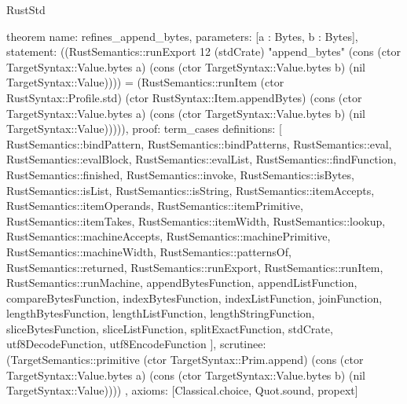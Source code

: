 \begin{lexlean}{RustStd}
\begin{semanticmodule}
theorem{
  name: refines_append_bytes,
  parameters: [a : Bytes, b : Bytes],
  statement: ((RustSemantics::runExport 12 (stdCrate) "append_bytes" (cons (ctor TargetSyntax::Value.bytes a) (cons (ctor TargetSyntax::Value.bytes b) (nil TargetSyntax::Value)))) = (RustSemantics::runItem (ctor RustSyntax::Profile.std) (ctor RustSyntax::Item.appendBytes) (cons (ctor TargetSyntax::Value.bytes a) (cons (ctor TargetSyntax::Value.bytes b) (nil TargetSyntax::Value))))),
  proof: term_cases{
    definitions: [
      RustSemantics::bindPattern,
      RustSemantics::bindPatterns,
      RustSemantics::eval,
      RustSemantics::evalBlock,
      RustSemantics::evalList,
      RustSemantics::findFunction,
      RustSemantics::finished,
      RustSemantics::invoke,
      RustSemantics::isBytes,
      RustSemantics::isList,
      RustSemantics::isString,
      RustSemantics::itemAccepts,
      RustSemantics::itemOperands,
      RustSemantics::itemPrimitive,
      RustSemantics::itemTakes,
      RustSemantics::itemWidth,
      RustSemantics::lookup,
      RustSemantics::machineAccepts,
      RustSemantics::machinePrimitive,
      RustSemantics::machineWidth,
      RustSemantics::patternsOf,
      RustSemantics::returned,
      RustSemantics::runExport,
      RustSemantics::runItem,
      RustSemantics::runMachine,
      appendBytesFunction,
      appendListFunction,
      compareBytesFunction,
      indexBytesFunction,
      indexListFunction,
      joinFunction,
      lengthBytesFunction,
      lengthListFunction,
      lengthStringFunction,
      sliceBytesFunction,
      sliceListFunction,
      splitExactFunction,
      stdCrate,
      utf8DecodeFunction,
      utf8EncodeFunction
    ],
    scrutinee: (TargetSemantics::primitive (ctor TargetSyntax::Prim.append) (cons (ctor TargetSyntax::Value.bytes a) (cons (ctor TargetSyntax::Value.bytes b) (nil TargetSyntax::Value))))
  },
  axioms: [Classical.choice, Quot.sound, propext]
}


\end{semanticmodule}
\end{lexlean}
